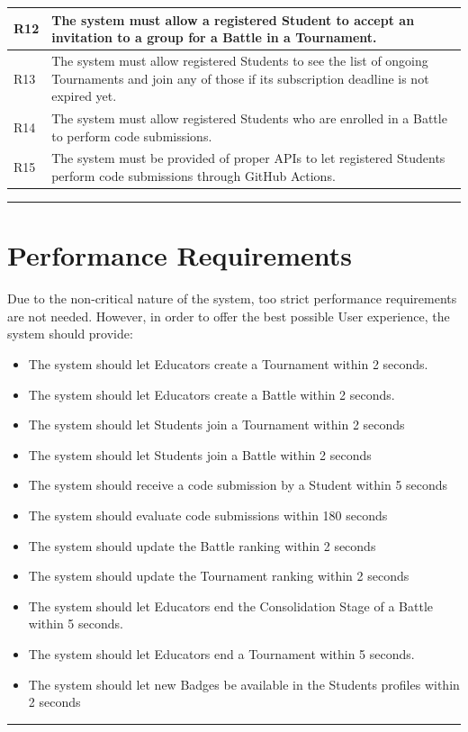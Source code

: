 \documentclass{Configuration_Files/Template}
\begin{document}
\begin{xltabular}{\textwidth}{| l | X |}
\hline
R12 & The system must allow a registered Student to accept an invitation to a group for a Battle in a Tournament.\\ [1ex]
\hline
R13 & The system must allow registered Students to see the list of ongoing Tournaments and join any of those if its subscription deadline is not expired yet.\\ [1ex]
\hline
R14 & The system must allow registered Students who are enrolled in a Battle to perform code submissions.\\ [1ex]
\hline
R15 & The system must be provided of proper APIs to let registered Students perform code submissions through GitHub Actions.\\ [1ex]
\hline
\end{xltabular}

{\color{bluepoli}\rule{\linewidth}{0.1pt}}

\section{Performance Requirements}

Due to the non-critical nature of the system, too strict performance requirements are not needed. 
However, in order to offer the best possible User experience, the system should provide:

\begin{itemize}
\item The system should let Educators create a Tournament within 2 seconds.
\item The system should let Educators create a Battle within 2 seconds.
\item The system should let Students join a Tournament within 2 seconds
\item The system should let Students join a Battle within 2 seconds
\item The system should receive a code submission by a Student within 5 seconds
\item The system should evaluate code submissions within 180 seconds
\item The system should update the Battle ranking within 2 seconds
\item The system should update the Tournament ranking within 2 seconds
\item The system should let Educators end the Consolidation Stage of a Battle within 5 seconds.
\item The system should let Educators end a Tournament within 5 seconds.
\item The system should let new Badges be available in the Students profiles within 2 seconds\\
\end{itemize}
{\color{bluepoli}\rule{\linewidth}{0.1pt}}
\end{document}
